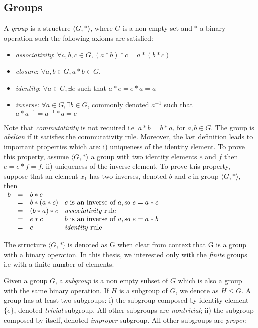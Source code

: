 \subsection{Groups}

A \emph{group} is a structure $\langle G, * \rangle$, where $G$ is a non empty set and $*$ a binary
operation such the following axioms are satisfied:
\begin{itemize}[noitemsep,nolistsep]
	\item \emph{associativity}: $\forall a, b, c \in G, (a * b) * c = a * (b * c)$
	\item \emph{closure}: $\forall a, b \in G, a * b \in G$.
	\item \emph{identity}: $\forall a \in G, \exists e$ such that $ a * e = e * a = a$
	\item \emph{inverse}:  $\forall a \in G, \exists b \in G$, commonly denoted $a^{-1}$ such that
	 $a * a^{-1} = a^{-1} * a = e$
\end{itemize}

Note that \emph{commutativity} is not required i.e $\ a * b = b * a$, for $a, b \in G$.
The group is \emph{abelian} if it satisfies the commutativity rule.
Moreover, the last definition leads to important properties which are: i) uniqueness of the identity element. 
To prove this property, assume $\langle G, * \rangle$ a group with two identity elements $e$ and $f$ 
then $ e = e * f = f$.
ii) uniqueness of the inverse element. To prove this property, suppose that an element $x_1$ has two inverses,
denoted $b$ and $c$ in group $\langle G, * \rangle$, then\\
	$\begin{array}{lcll}					
			b & = & b * e & \\
			  & = & b * (a * c) & c \text{ is an inverse of } a, \text{so } e = a * c\\
			  & = & (b * a) * c &   \text{\emph{associativity} rule}\\
			  & = & e * c       & b \text{ is an inverse of } a, \text{so } e = a * b\\
			  & = & c           &   \text{\emph{identity} rule}
	\end{array}$

The structure $\langle G, * \rangle$ is denoted as G when clear from context that G is a group
with a binary operation. In this thesis, we interested only with the \emph{finite} groups i.e
with a finite number of elements.

Given a group $G$, a \emph{subgroup} is a non empty subset of $G$ which is also a group with 
the same binary operation. If $H$ is a subgroup of $G$, we denote as $H \leq G$.
A group has at least two subgroups: i) the subgroup composed by identity element $\{e\}$, denoted \emph{trivial} subgroup. All other subgroups are \emph{nontrivial}; ii) the subgroup composed by itself, denoted \emph{improper} subgroup. All other subgroups are \emph{proper}.


